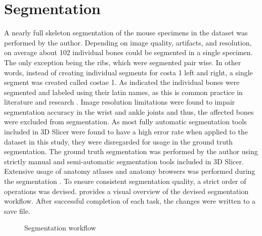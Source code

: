 \section{Segmentation}\label{s:segmentation}
A nearly full skeleton segmentation of the mouse specimens in the dataset was performed by the author.
Depending on image quality, artifacts, and resolution, on average about 102 individual bones could be segmented in a single specimen.
The only exception being the ribs, which were segmented pair wise.
In other words, instead of creating individual segments for costa 1 left and right, a single segment was created called costae 1.
As indicated the individual bones were segmented and labeled using their latin names, as this is common practice in literature and research \cite{harrisonVertebralLandmarksIdentification2013,jeromeSkeletalSystem2018,ruberteMorphologicalMousePhenotyping2017,ruberteBridgingMouseHuman2023}.
Image resolution limitations were found to impair segmentation accuracy in the wrist and ankle joints and thus, the affected bones were excluded from segmentation.
As most fully automatic segmentation tools included in 3D Slicer were found to have a high error rate when applied to the dataset in this study, they were disregarded for usage in the ground truth segmentation.
The ground truth segmentation was performed by the author using strictly manual and semi-automatic segmentation tools included in 3D Slicer.
Extensive usage of anatomy atlases and anatomy browsers was performed during the segmentation \cite{jeromeSkeletalSystem2018,harrisonVertebralLandmarksIdentification2013,platzerTaschenatlasAnatomieBd2013,ruberteMorphologicalMousePhenotyping2017,ruberteBridgingMouseHuman2023,rautenkranzSectionalanatomy2018}.
To ensure consistent segmentation quality, a strict order of operations was devised.
 provides a visual overview of the devised segmentation workflow.
After successful completion of each task, the changes were written to a save file.
\begin{figure}[ht]
	\begin{center}
		
	\end{center}
	\caption{Segmentation workflow}\label{fig:segmentation-workflow}
\end{figure}

